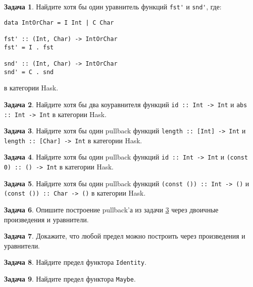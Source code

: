 \documentclass[10pt]{article}
\theoremstyle{definition}
\newtheorem{Pm}{Задача}[subsection]
\begin{document}
\begin{Pm}
    Найдите хотя бы один уравнитель функций \verb|fst'| и \verb|snd'|, где:
    \begin{verbatim}
data IntOrChar = I Int | C Char

fst' :: (Int, Char) -> IntOrChar
fst' = I . fst

snd' :: (Int, Char) -> IntOrChar
snd' = C . snd
    \end{verbatim}
    
    в категории Hask.
\end{Pm}

\begin{Pm}
    Найдите хотя бы два коуравнителя функций \verb|id :: Int -> Int| и \verb|abs :: Int -> Int| в категории Hask.
\end{Pm}

\begin{Pm}
    Найдите хотя бы один pullback функций \verb|length :: [Int] -> Int| и \verb|length :: [Char] -> Int| в категории Hask.
    \label{pullback1}
\end{Pm}

\begin{Pm}
    Найдите хотя бы один pullback функций \verb|id :: Int -> Int| и \verb|(const 0) :: () -> Int| в категории Hask.
\end{Pm}

\begin{Pm}
    Найдите хотя бы один pullback функций \verb|(const ()) :: Int -> ()| и \verb|(const ()) :: Char -> ()| в категории Hask.
\end{Pm}

\begin{Pm}
    Опишите построение pullback'а из задачи \ref{pullback1} через двоичные произведения и уравнители.
\end{Pm}

\begin{Pm}
    Докажите, что любой предел можно построить через произведения и уравнители.
\end{Pm}

\begin{Pm}
    Найдите предел функтора \verb|Identity|.
\end{Pm}

\begin{Pm}
    Найдите предел функтора \verb|Maybe|.
\end{Pm}
\end{document}
